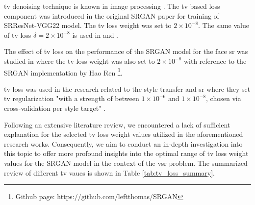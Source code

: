 \documentclass[conference]{IEEEtran}
\begin{document}
\Acrfull{tv} denoising technique is known in image processing \cite{nonlinear_total_variation_noise_removal_1992}. The \acrlong{tv} based loss component was introduced in the original SRGAN paper \cite{srgan_2016} for training of SRResNet-VGG22 model. The \acrshort{tv} loss weight was set to $2 \times 10^{-8}$. The same value of \acrshort{tv} loss $\delta=2 \times 10^{-8}$ is used in \cite{iSeeBetter_2020} and \cite{iSeeBetter_milestone}.

The effect of \acrshort{tv} loss on the performance of the SRGAN model for the face \acrlong{sr} was studied in \cite{SRGAN_with_tv_loss_face_2020} where the \acrshort{tv} loss weight was also set to $2 \times 10^{-8}$ with reference to the SRGAN implementation by Hao Ren \footnote{Github page: https://github.com/leftthomas/SRGAN}.

\Acrshort{tv} loss was used in the research related to the style transfer and \acrlong{sr} \cite{Perceptual_Losses_for_Real_Time_Style_Transfer_and_Super_Resolution_2016} where they set \acrlong{tv} regularization "with a strength of between $1 \times 10^{-6}$ and $1 \times 10^{-8}$, chosen via cross-validation per style target" \cite{Perceptual_Losses_for_Real_Time_Style_Transfer_and_Super_Resolution_2016}.

Following an extensive literature review, we encountered a lack of sufficient explanation for the selected \acrshort{tv} loss weight values utilized in the aforementioned research works. Consequently, we aim to conduct an in-depth investigation into this topic to offer more profound insights into the optimal range of \acrshort{tv} loss weight values for the SRGAN model in the context of the \acrshort{vsr} problem. The summarized review of different \acrshort{tv} vaues is shown in Table \ref{tab:tv_loss_summary}.
\end{document}
